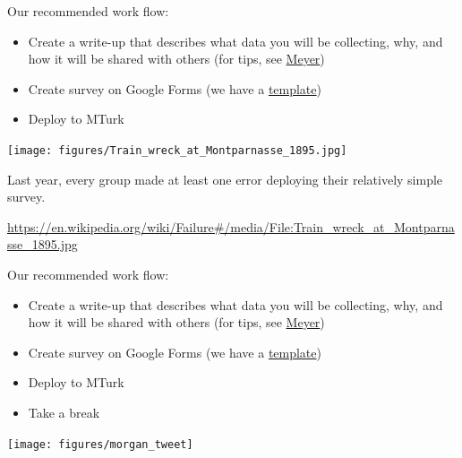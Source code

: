 \documentclass[aspectratio=169]{beamer}
\begin{document}
\begin{frame}

Our recommended work flow:
\begin{itemize}
\item Create a write-up that describes what data you will be collecting, why, and how it will be shared with others (for tips, see \href{https://doi.org/10.1177/2515245917747656}{Meyer})
\item Create survey on Google Forms (we have a \href{https://github.com/compsocialscience/summer-institute/blob/master/2019/materials/day4-surveys/activity/2019-06-13_mturk_google_survey.pdf}{template})
\pause
\item Deploy to MTurk
\end{itemize}

\end{frame}
\begin{frame}

\begin{center}
\texttt{[image: figures/Train\_wreck\_at\_Montparnasse\_1895.jpg]}
\end{center}

Last year, every group made at least one error deploying their relatively simple survey.

\vfill

{\tiny \url{https://en.wikipedia.org/wiki/Failure\#/media/File:Train_wreck_at_Montparnasse_1895.jpg}}
\end{frame}
\begin{frame}

Our recommended work flow:
\begin{itemize}
\item Create a write-up that describes what data you will be collecting, why, and how it will be shared with others (for tips, see \href{https://doi.org/10.1177/2515245917747656}{Meyer})
\item Create survey on Google Forms (we have a \href{https://github.com/compsocialscience/summer-institute/blob/master/2019/materials/day4-surveys/activity/2019-06-13_mturk_google_survey.pdf}{template})
\item Deploy to MTurk
\pause
\item Take a break
\end{itemize}

\end{frame}
\begin{frame}

\begin{center}
\texttt{[image: figures/morgan\_tweet]}
\end{center}

\end{frame}
\end{document}
